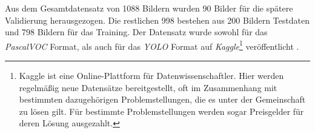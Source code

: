Aus dem Gesamtdatensatz von 1088 Bildern wurden 90 Bilder für die spätere Validierung herausgezogen. Die restlichen 998 bestehen aus 200 Bildern Testdaten und 798 Bildern für das Training. Der Datensatz wurde sowohl für das \textit{PascalVOC} Format, als auch für das \textit{YOLO} Format auf \textit{Kaggle}\footnote{Kaggle ist eine Online-Plattform für Datenwissenschaftler. Hier werden regelmäßig neue Datensätze bereitgestellt, oft im Zusammenhang mit bestimmten dazugehörigen Problemstellungen, die es unter der Gemeinschaft zu lösen gilt. Für bestimmte Problemstellungen werden sogar Preisgelder für deren Lösung ausgezahlt.} veröffentlicht \cite{FelixHausberger.20200503}.
